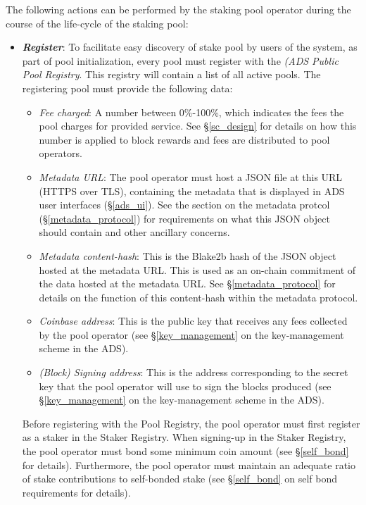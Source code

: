 The following actions can be performed by the staking pool operator during the course of the life-cycle of the staking pool: 
\begin{itemize}
    \item \textbf{\textit{Register}}: To facilitate easy discovery of stake pool by users of the system, as part of pool initialization, every pool must register with the \textit{(ADS Public Pool Registry}. This registry will contain a list of all active pools. The registering pool must provide the following data: 
    \begin{itemize}
        \item \textit{Fee charged}: A number between 0\%-100\%, which indicates the fees the pool charges for provided service. See \S\ref{sc_design} for details on how this number is applied to block rewards and fees are distributed to pool operators. 
        \item \textit{Metadata URL}: The pool operator must host a JSON file at this URL (HTTPS over TLS), containing the metadata that is displayed in ADS user interfaces (\S\ref{ads_ui}). See the section on the metadata protcol (\S\ref{metadata_protocol}) for requirements on what this JSON object should contain and other ancillary concerns. 
        \item \textit{Metadata content-hash}: This is the Blake2b hash of the JSON object hosted at the metadata URL. This is used as an on-chain commitment of the data hosted at the metadata URL. See \S\ref{metadata_protocol} for details on the function of this content-hash within the metadata protocol. 
        \item \textit{Coinbase address}: This is the public key that receives any fees collected by the pool operator (see \S\ref{key_management} on the key-management scheme in the ADS). 
        \item \textit{(Block) Signing address}: This is the address corresponding to the secret key that the pool operator will use to sign the blocks produced (see \S\ref{key_management} on the key-management scheme in the ADS). 
    \end{itemize}
    
    Before registering with the Pool Registry, the pool operator must first register as a staker in the Staker Registry. When signing-up in the Staker Registry, the pool operator must bond some minimum coin amount (see \S\ref{self_bond} for details). Furthermore, the pool operator must maintain an adequate ratio of stake contributions to self-bonded stake (see \S\ref{self_bond} on self bond requirements for details).
    

\end{itemize}
